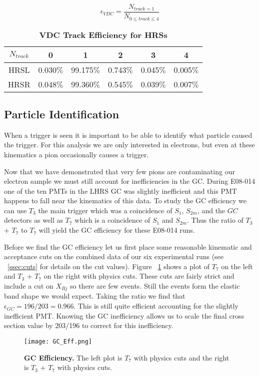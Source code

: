 \begin{equation} \label{eq:vdc_eff}
	\epsilon_{VDC} = \frac{N_{track=1}}{N_{0 \leq track \leq 4}}
\end{equation}

\begin{table}[!h]
\centering
\begin{tabular}{|c c c c c c|}
\hline
\textbf{$N_{track}$} & \textbf{0} & \textbf{1} & \textbf{2} & \textbf{3} & \textbf{4}\\
\hline
HRSL & 0.030$\%$ & 99.175$\%$ & 0.743$\%$ & 0.045$\%$ & 0.005$\%$ \\  
HRSR & 0.048$\%$ & 99.360$\%$ & 0.545$\%$ & 0.039$\%$ & 0.007$\%$ \\ 
\hline
\end{tabular}
\caption{{\bf{VDC Track Efficiency for HRSs}} }
\label{tab:vdc_eff}
\end{table}

\subsection{Particle Identification}
\label{ssec:pid}

When a trigger is seen it is important to be able to identify what particle caused the trigger. For this analysis we are only interested in electrons, but even at these kinematics a pion occasionally causes a trigger. 

Now that we have demonstrated that very few pions are contaminating our electron sample we must still account for inefficiencies in the GC. During E08-014 one of the ten PMTs in the LHRS GC was slightly inefficient and this PMT happens to fall near the kinematics of this data. To study the GC efficiency we can use $T_3$ the main trigger which was a coincidence of $S_1$, $S_{2m}$, and the $GC$ detectors as well as $T_7$ which is a coincidence of $S_1$ and $S_{2m}$. Thus the ratio of $T_3$ + $T_7$ to $T_7$ will yield the GC efficiency for these E08-014 runs. 

Before we find the GC efficiency let us first place some reasonable kinematic and acceptance cuts on the combined data of our six experimental runs (see ~\ref{ssec:cuts} for details on the cut values). Figure ~\ref{fig:gc_eff} shows a plot of $T_7$ on the left and $T_3$ + $T_7$ on the right with physics cuts. These cuts are fairly strict and include a cut on $X_{Bj}$ so there are few events. Still the events form the elastic band shape we would expect. Taking the ratio we find that $\epsilon_{GC} = 196/203 = 0.966$. This is still quite efficient accounting for the slightly inefficient PMT. Knowing the GC inefficiency allows us to scale the final cross section value by 203/196 to correct for this inefficiency.

\begin{figure}[!ht]
\begin{center}
\texttt{[image: GC\_Eff.png]}
\end{center}
\caption{
{\bf{GC Efficiency.}} The left plot is $T_7$ with physics cuts and the right is $T_3$ + $T_7$ with physics cuts.}
\label{fig:gc_eff}
\end{figure}